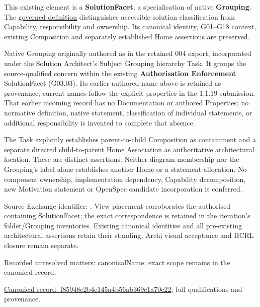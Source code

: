 This existing element is a \textbf{SolutionFacet}, a specialisation of native
\textbf{Grouping}. The \href{\detokenize{../../../../../../../governance/continuum-representation.md#solutionfacet-classification--1119-candidate}}{governed definition}
distinguishes accessible solution classification from Capability, responsibility
and ownership. Its canonical identity, G01–G18 context, existing Composition
and separately established Home assertions are preserved.



Native Grouping originally authored as \texttt{} in the retained 004 export,
incorporated under the Solution Architect's Subject Grouping hierarchy Task.
It groups the source-qualified \texttt{} concern within
the existing \textbf{Authorisation Enforcement} SolutionFacet (G03.03). Its earlier authored name above is retained as provenance; current names
follow the explicit properties in the 1.1.19 submission.
That earlier incoming record has no Documentation or authored Properties; no normative
definition, native statement, classification of individual statements, or
additional responsibility is invented to complete that absence.



The Task explicitly establishes parent-to-child Composition as containment and
a separate directed child-to-parent Home Association as authoritative architectural
location. These are distinct assertions. Neither diagram membership nor the
Grouping's label alone establishes another Home or a statement allocation.
No component ownership, implementation dependency, Capability decomposition,
new Motivation statement or OpenSpec candidate incorporation is conferred.



Source Exchange identifier: \texttt{}. View placement corroborates
the authorised containing SolutionFacet; the exact correspondence is retained in the
iteration's folder/Grouping inventories. Existing canonical identities and all
pre-existing architectural assertions retain their standing. Archi visual
acceptance and HCRL closure remain separate.


{\small Recorded unresolved matters: canonicalName; exact scope remains in the canonical record.}\par
{\footnotesize \href{../../../../../../../continuum/grouping/f85948e2b4e145a4b56ab369c1a70c22.md}{Canonical record: f85948e2b4e145a4b56ab369c1a70c22}; full qualifications and provenance.}\par
